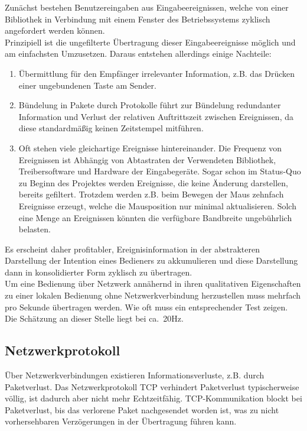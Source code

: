 Zunächst bestehen Benutzereingaben aus Eingabeereignissen, welche von einer Bibliothek in Verbindung mit einem Fenster des Betriebssystems zyklisch angefordert werden können.\\
Prinzipiell ist die ungefilterte Übertragung dieser Eingabeereignisse möglich und am einfachsten Umzusetzen. Daraus entstehen allerdings einige Nachteile:
\begin{enumerate}
\item Übermittlung für den Empfänger irrelevanter Information, z.B. das Drücken einer ungebundenen Taste am Sender.
\item Bündelung in Pakete durch Protokolle führt zur Bündelung redundanter Information und Verlust der relativen Auftrittszeit zwischen Ereignissen, da diese standardmäßig keinen Zeitstempel mitführen.
\item Oft stehen viele gleichartige Ereignisse hintereinander. Die Frequenz von Ereignissen ist Abhängig von Abtastraten der Verwendeten Bibliothek, Treibersoftware und Hardware der Eingabegeräte. Sogar schon im Status-Quo zu Beginn des Projektes werden Ereignisse, die keine Änderung darstellen, bereits gefiltert. Trotzdem werden z.B. beim Bewegen der Maus zehnfach Ereignisse erzeugt, welche die Mausposition nur minimal aktualisieren. Solch eine Menge an Ereignissen könnten die verfügbare Bandbreite ungebührlich belasten.
\end{enumerate}
Es erscheint daher profitabler, Ereignisinformation in der abstrakteren Darstellung der Intention eines Bedieners zu akkumulieren und diese Darstellung dann in konsolidierter Form zyklisch zu übertragen.\\
Um eine Bedienung über Netzwerk annähernd in ihren qualitativen Eigenschaften zu einer lokalen Bedienung ohne Netzwerkverbindung herzustellen muss mehrfach pro Sekunde übertragen werden. Wie oft muss ein entsprechender Test zeigen. Die Schätzung an dieser Stelle liegt bei ca.~20Hz.\\

\subsection{Netzwerkprotokoll}
Über Netzwerkverbindungen existieren Informationsverluste, z.B. durch Paketverlust. Das Netzwerkprotokoll TCP verhindert Paketverlust typischerweise völlig, ist dadurch aber nicht mehr Echtzeitfähig. TCP-Kommunikation blockt bei Paketverlust, bis das verlorene Paket nachgesendet worden ist, was zu nicht vorhersehbaren Verzögerungen in der Übertragung führen kann.



